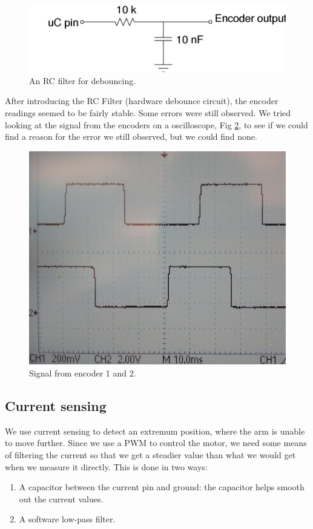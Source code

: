 \documentclass[10pt,a4paper]{article}
\begin{document}
\begin{figure}[H]
    \centering
    \includegraphics[scale=0.5]{debouncer.jpg}
    \caption{An RC filter for debouncing.}
    \label{fig:rcfilter}
\end{figure}

After introducing the RC Filter (hardware debounce circuit), the
encoder readings seemed to be fairly stable. Some errors were still
observed. We tried looking at the signal from the encoders on a oscilloscope, Fig \ref{fig:encoderSignal}, to see if we could find a reason for the error we still observed, but we could find none. 

\begin{figure}[H]
    \centering
    \includegraphics[scale=0.3]{encoderSignal.jpg}
    \caption{Signal from encoder 1 and 2.}
    \label{fig:encoderSignal}
\end{figure}

\subsection{Current sensing}
We use current sensing to detect an extremum position, where the arm
is unable to move further. Since we use a PWM to control the motor, we
need some means of filtering the current so that we get a steadier
value than what we would get when we measure it directly. This is done
in two ways: 
\begin{enumerate}
\item A capacitor between the current pin and ground: the capacitor
  helps smooth out the current values.
\item A software low-pass filter.
\end{enumerate}
\end{document}
